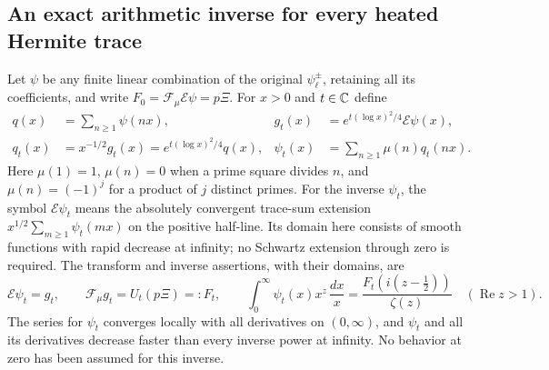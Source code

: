 \subsection{An exact arithmetic inverse for every heated Hermite trace}
\label{sec:cq-moebius}
Let $\psi$ be any finite linear combination of the original
$\psi_\ell^\pm$, retaining all its coefficients, and write
$F_0=\mathcal F_\mu\mathcal E\psi=p\Xi$. For $x>0$ and
$t\in\mathbb C$ define
\begin{equation}\label{eq:cq-moebius-data}
 \begin{aligned}
 q(x)&=\sum_{n\geq1}\psi(nx),&
 g_t(x)&=e^{t(\log x)^2/4}\mathcal E\psi(x),\\
 q_t(x)&=x^{-1/2}g_t(x)=e^{t(\log x)^2/4}q(x),&
 \psi_t(x)&=\sum_{n\geq1}\mu(n)q_t(nx).
 \end{aligned}
\end{equation}
Here $\mu(1)=1$, $\mu(n)=0$ when a prime square divides $n$,
and $\mu(n)=(-1)^j$ for a product of $j$ distinct primes.
For the inverse $\psi_t$, the symbol $\mathcal E\psi_t$ means
the absolutely convergent trace-sum extension
$x^{1/2}\sum_{m\geq1}\psi_t(mx)$ on the positive half-line.
Its domain here consists of smooth functions with rapid decrease
at infinity; no Schwartz extension through zero is required.
The transform and inverse assertions, with their domains, are
\begin{equation}\label{eq:cq-moebius-inverse}
 \mathcal E\psi_t=g_t,\qquad
 \mathcal F_\mu g_t=U_t(p\Xi)=:F_t,\qquad
 \int_0^\infty\psi_t(x)x^z\,\frac{dx}{x}
       =\frac{F_t(i(z-\tfrac12))}{\zeta(z)}
       \quad(\operatorname{Re}z>1).
\end{equation}
The series for $\psi_t$ converges locally with all derivatives on
$(0,\infty)$, and $\psi_t$ and all its derivatives decrease faster
than every inverse power at infinity. No behavior at zero has been
assumed for this inverse.

